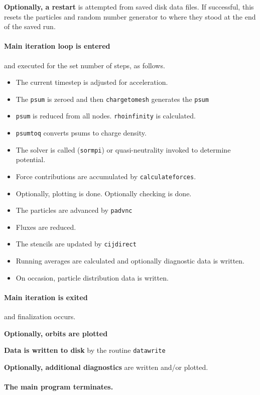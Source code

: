 \documentclass[12pt]{article}
\def\sentence#1{\par\noindent\textbf{#1}}
\begin{document}
\sentence{Optionally, a restart} is attempted from saved disk data
files. If successful, this resets the particles and random number
generator to where they stood at the end of the saved run.

\paragraph{Main iteration loop is entered} and executed for the set
number of steps, as follows.
\begin{itemize}\itemsep=0pt
\item The current timestep is adjusted for acceleration.
\item The \verb!psum! is zeroed and then \verb!chargetomesh! generates
  the \verb!psum!
\item \verb!psum! is reduced from all nodes. \verb!rhoinfinity! is calculated.
\item \verb!psumtoq! converts psums to charge density.
\item The solver is called (\verb!sormpi!) or
  quasi-neutrality invoked to determine potential.
\item Force contributions are accumulated by \verb!calculateforces!.
\item Optionally, plotting is done. Optionally checking is done.
\item The particles are advanced by \verb!padvnc!
\item Fluxes are reduced.
\item The stencils are updated by \verb!cijdirect!
\item Running averages are calculated and optionally diagnostic data
  is written. 
\item On occasion, particle distribution data is written. 
\end{itemize}


\paragraph{Main iteration is exited} and finalization occurs.

\sentence{Optionally, orbits are plotted}

\sentence{Data is written to disk} by the routine \verb!datawrite!

\sentence{Optionally, additional diagnostics} are written and/or
plotted.

\paragraph{The main program terminates.}
\end{document}
